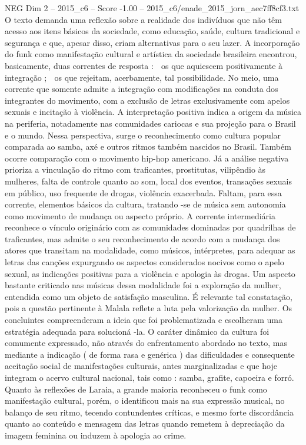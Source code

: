 \begin{textsample}{NEG Dim 2 – 2015\_c6 – Score -1.00 – 2015\_c6/enade\_2015\_jorn\_aec7ff8cf3.txt}
O texto demanda uma reflexão sobre a realidade dos indivíduos que não têm acesso aos itens básicos da sociedade, como educação, saúde, cultura tradicional e segurança e que, apesar disso, criam alternativas para o seu lazer.
A incorporação do funk como manifestação cultural e artística da sociedade brasileira encontrou, basicamente, duas correntes de resposta :  os que aquiescem positivamente à integração ;  os que rejeitam, acerbamente, tal possibilidade.
No meio, uma corrente que somente admite a integração com modificações na conduta dos integrantes do movimento, com a exclusão de letras exclusivamente com apelos sexuais e incitação à violência.
A interpretação positiva indica a origem da música na periferia, notadamente nas comunidades cariocas e sua projeção para o Brasil e o mundo.
Nessa perspectiva, surge o reconhecimento como cultura popular comparada ao samba, axé e outros ritmos também nascidos no Brasil.
Também ocorre comparação com o movimento hip-hop americano.
Já a análise negativa prioriza a vinculação do ritmo com traficantes, prostitutas, vilipêndio às mulheres, falta de controle quanto ao som, local dos eventos, transações sexuais em público, uso frequente de drogas, violência exacerbada.
Faltam, para essa corrente, elementos básicos da cultura, tratando -se de música sem autonomia como movimento de mudança ou aspecto próprio.
A corrente intermediária reconhece o vínculo originário com as comunidades dominadas por quadrilhas de traficantes, mas admite o seu reconhecimento de acordo com a mudança dos atores que transitam na modalidade, como músicos, intérpretes, para adequar as letras das canções expurgando os aspectos considerados nocivos como o apelo sexual, as indicações positivas para a violência e apologia às drogas.
Um aspecto bastante criticado nas músicas dessa modalidade foi a exploração da mulher, entendida como um objeto de satisfação masculina.
É relevante tal constatação, pois a questão pertinente à Malala reflete a luta pela valorização da mulher.
Os concluintes compreenderam a ideia que foi problematizada e escolheram uma estratégia adequada para solucioná -la.
O caráter dinâmico da cultura foi comumente expressado, não através do enfrentamento abordado no texto, mas mediante a indicação ( de forma rasa e genérica ) das dificuldades e consequente aceitação social de manifestações culturais, antes marginalizadas e que hoje integram o acervo cultural nacional, tais como : samba, grafite, capoeira e forró.
Quanto às reflexões de Laraia, a grande maioria reconheceu o funk como manifestação cultural, porém, o identificou mais na sua expressão musical, no balanço de seu ritmo, tecendo contundentes críticas, e mesmo forte discordância quanto ao conteúdo e mensagem das letras quando remetem à depreciação da imagem feminina ou induzem à apologia ao crime.

\end{textsample}
